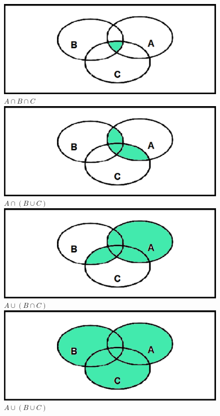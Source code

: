 \documentclass[12pt]{article}
\begin{document}
\section{}
	\begin{figure}[h!]
		\includegraphics[scale=0.5]{q6a} $ A \cap B \cap C $ \\
		\includegraphics[scale=0.5]{q6b} $ A \cap (B \cup C) $ \\
		\includegraphics[scale=0.5]{q6c} $ A \cup (B \cap C) $ \\
		\includegraphics[scale=0.5]{q6d} $ A \cup (B \cup C) $ \\
	\end{figure}
\end{document}
